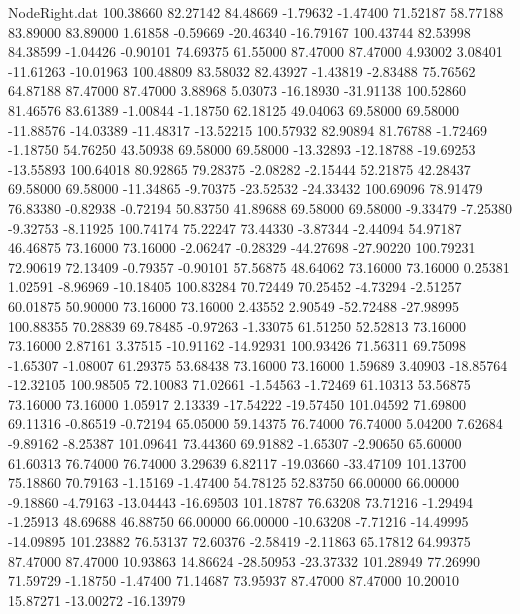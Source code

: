 \begin{filecontents}{NodeRight.dat}
 100.38660   82.27142   84.48669    -1.79632   -1.47400   71.52187   58.77188   83.89000   83.89000    1.61858   -0.59669  -20.46340  -16.79167
 100.43744   82.53998   84.38599    -1.04426   -0.90101   74.69375   61.55000   87.47000   87.47000    4.93002    3.08401  -11.61263  -10.01963
 100.48809   83.58032   82.43927    -1.43819   -2.83488   75.76562   64.87188   87.47000   87.47000    3.88968    5.03073  -16.18930  -31.91138
 100.52860   81.46576   83.61389    -1.00844   -1.18750   62.18125   49.04063   69.58000   69.58000  -11.88576  -14.03389  -11.48317  -13.52215
 100.57932   82.90894   81.76788    -1.72469   -1.18750   54.76250   43.50938   69.58000   69.58000  -13.32893  -12.18788  -19.69253  -13.55893
 100.64018   80.92865   79.28375    -2.08282   -2.15444   52.21875   42.28437   69.58000   69.58000  -11.34865   -9.70375  -23.52532  -24.33432
 100.69096   78.91479   76.83380    -0.82938   -0.72194   50.83750   41.89688   69.58000   69.58000   -9.33479   -7.25380   -9.32753   -8.11925
 100.74174   75.22247   73.44330    -3.87344   -2.44094   54.97187   46.46875   73.16000   73.16000   -2.06247   -0.28329  -44.27698  -27.90220
 100.79231   72.90619   72.13409    -0.79357   -0.90101   57.56875   48.64062   73.16000   73.16000    0.25381    1.02591   -8.96969  -10.18405
 100.83284   70.72449   70.25452    -4.73294   -2.51257   60.01875   50.90000   73.16000   73.16000    2.43552    2.90549  -52.72488  -27.98995
 100.88355   70.28839   69.78485    -0.97263   -1.33075   61.51250   52.52813   73.16000   73.16000    2.87161    3.37515  -10.91162  -14.92931
 100.93426   71.56311   69.75098    -1.65307   -1.08007   61.29375   53.68438   73.16000   73.16000    1.59689    3.40903  -18.85764  -12.32105
 100.98505   72.10083   71.02661    -1.54563   -1.72469   61.10313   53.56875   73.16000   73.16000    1.05917    2.13339  -17.54222  -19.57450
 101.04592   71.69800   69.11316    -0.86519   -0.72194   65.05000   59.14375   76.74000   76.74000    5.04200    7.62684   -9.89162   -8.25387
 101.09641   73.44360   69.91882    -1.65307   -2.90650   65.60000   61.60313   76.74000   76.74000    3.29639    6.82117  -19.03660  -33.47109
 101.13700   75.18860   70.79163    -1.15169   -1.47400   54.78125   52.83750   66.00000   66.00000   -9.18860   -4.79163  -13.04443  -16.69503
 101.18787   76.63208   73.71216    -1.29494   -1.25913   48.69688   46.88750   66.00000   66.00000  -10.63208   -7.71216  -14.49995  -14.09895
 101.23882   76.53137   72.60376    -2.58419   -2.11863   65.17812   64.99375   87.47000   87.47000   10.93863   14.86624  -28.50953  -23.37332
 101.28949   77.26990   71.59729    -1.18750   -1.47400   71.14687   73.95937   87.47000   87.47000   10.20010   15.87271  -13.00272  -16.13979

\end{filecontents}
